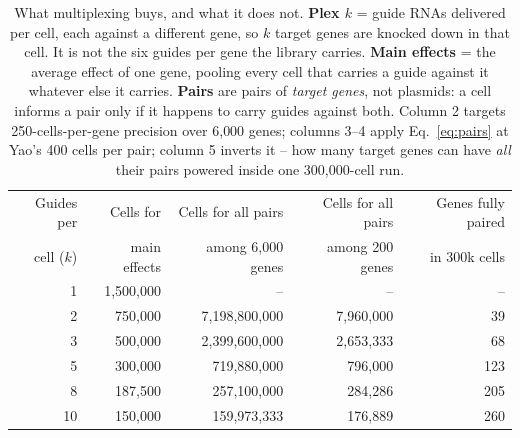 \begin{table}[htbp]\centering
\footnotesize
\caption[]{What multiplexing buys, and what it does not. \textbf{Plex $k$} = guide RNAs delivered per cell, each against a different gene, so $k$ target genes are knocked down in that cell. It is not the six guides per gene the library carries. \textbf{Main effects} = the average effect of one gene, pooling every cell that carries a guide against it whatever else it carries. \textbf{Pairs} are pairs of \emph{target genes}, not plasmids: a cell informs a pair only if it happens to carry guides against both. Column 2 targets 250-cells-per-gene precision over 6{,}000 genes; columns 3--4 apply Eq.~\ref{eq:pairs} at Yao's 400 cells per pair; column 5 inverts it -- how many target genes can have \emph{all} their pairs powered inside one 300{,}000-cell run.}\label{tab:multiplex}
\begin{tabular}{rrrrr}
\toprule
Guides per & Cells for & Cells for all pairs & Cells for all pairs & Genes fully paired \\
cell ($k$) & main effects & among 6{,}000 genes & among 200 genes & in 300k cells \\
\midrule
1 & 1{,}500{,}000 & -- & -- & -- \\
2 & 750{,}000 & 7{,}198{,}800{,}000 & 7{,}960{,}000 & 39 \\
3 & 500{,}000 & 2{,}399{,}600{,}000 & 2{,}653{,}333 & 68 \\
5 & 300{,}000 & 719{,}880{,}000 & 796{,}000 & 123 \\
8 & 187{,}500 & 257{,}100{,}000 & 284{,}286 & 205 \\
10 & 150{,}000 & 159{,}973{,}333 & 176{,}889 & 260 \\
\bottomrule
\end{tabular}
\end{table}
